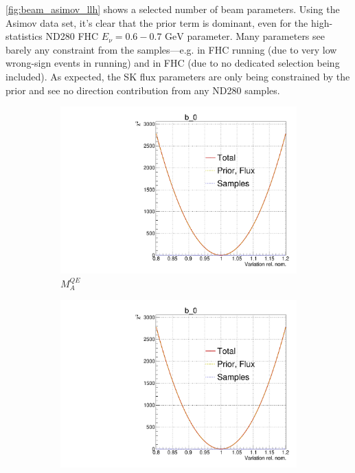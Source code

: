 \autoref{fig:beam_asimov_llh} shows a selected number of beam parameters. Using the Asimov data set, it's clear that the prior term is dominant, even for the high-statistics ND280 FHC \numu $E_\nu = 0.6-0.7\text{ GeV}$ parameter. Many parameters see barely any constraint from the samples---e.g. \numubar in FHC running (due to very low wrong-sign events in \numu running) and \nue in FHC (due to no dedicated \nue selection being included). As expected, the SK flux parameters are only being constrained by the prior and see no direction contribution from any ND280 samples.
\begin{figure}[h]
	\centering
	\begin{subfigure}[t]{0.32\textwidth}
		\includegraphics[width=\textwidth, trim={0mm 0mm 0mm 11mm}, clip,page=107]{figures/mach3/Asimov/Full_LLHscan_18July_BeRPA_U_ND280logL_scan}
		\caption{$M_A^{QE}$}
	\end{subfigure}
	\begin{subfigure}[t]{0.32\textwidth}
		\includegraphics[width=\textwidth, trim={0mm 0mm 0mm 11mm}, clip,page=110]{figures/mach3/Asimov/Full_LLHscan_18July_BeRPA_U_ND280logL_scan}

\end{subfigure}
\end{figure}

